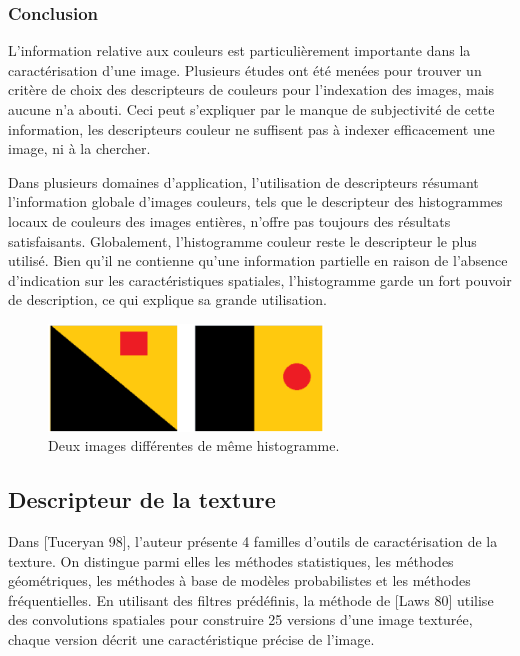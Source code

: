 \subsubsection{Conclusion}
L'information relative aux couleurs est particulièrement importante dans la caractérisation d’une image. Plusieurs études ont été menées pour trouver un critère de choix des descripteurs de couleurs pour l'indexation des images, mais aucune n'a abouti. Ceci peut s’expliquer par le manque de subjectivité de cette information, les descripteurs couleur ne suffisent pas à indexer efficacement une image, ni à la chercher.

Dans plusieurs domaines d’application, l’utilisation de descripteurs résumant l’information globale d’images couleurs, tels que le descripteur des histogrammes locaux de couleurs des images entières, n’offre pas toujours des résultats satisfaisants. Globalement, l’histogramme couleur reste le descripteur le plus utilisé. Bien qu’il ne contienne qu’une information partielle en raison de l’absence d’indication sur les caractéristiques spatiales, l’histogramme garde un fort pouvoir de description, ce qui explique sa grande utilisation.

\begin{figure}[H]
	\label{fig:samehist}
	\centering
	\includegraphics[width=0.65\textwidth]{Figures/sameHist} %
	\caption{Deux images différentes de même histogramme.}
	
\end{figure}

\subsection{Descripteur de la texture}
 
Dans [Tuceryan 98], l’auteur présente 4 familles d'outils de caractérisation de la texture. On distingue parmi elles les méthodes statistiques, les méthodes géométriques, les méthodes à base de modèles probabilistes et les méthodes fréquentielles. En utilisant des filtres prédéfinis, la méthode de [Laws 80] utilise des convolutions spatiales pour construire 25 versions d’une image texturée, chaque version décrit une caractéristique précise de l’image.\\


